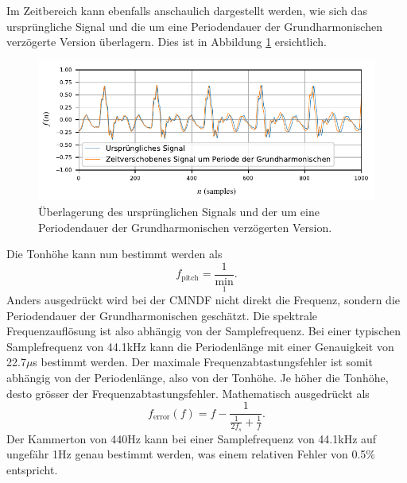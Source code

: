 Im Zeitbereich kann ebenfalls anschaulich dargestellt werden, wie sich das ursprüngliche Signal und die um eine Periodendauer der Grundharmonischen verzögerte Version überlagern.
Dies ist in Abbildung \ref{autotune:fig:audioShifted} ersichtlich.
\begin{figure}
	\centering
	\includegraphics[width=\textwidth]{papers/autotune/images/Example-Audio-Shifted.pdf}
	\caption{Überlagerung des ursprünglichen Signals und der um eine Periodendauer der Grundharmonischen verzögerten Version.}
    \label{autotune:fig:audioShifted}
\end{figure}

Die Tonhöhe kann nun bestimmt werden als
\begin{equation}
    f_{\text{pitch}}
    =
    \frac{1}{\operatorname{min}_1}.
\end{equation}
Anders ausgedrückt wird bei der CMNDF nicht direkt die Frequenz, sondern die Periodendauer der Grundharmonischen geschätzt.
Die spektrale Frequenzauflösung ist also abhängig von der Samplefrequenz.
Bei einer typischen Samplefrequenz von 44.1\;kHz kann die Periodenlänge mit einer Genauigkeit von 22.7\;$\mu$s bestimmt werden.
Der maximale Frequenzabtastungsfehler ist somit abhängig von der Periodenlänge, also von der Tonhöhe.
Je höher die Tonhöhe, desto grösser der Frequenzabtastungsfehler.
Mathematisch ausgedrückt als
\begin{equation}
    f_{\text{error}}(f)
    =
    f - \frac{1}{\frac{1}{2 f_s} + \frac{1}{f}}.
\end{equation}
Der Kammerton von 440\;Hz kann bei einer Samplefrequenz von 44.1\;kHz auf ungefähr 1\;Hz genau bestimmt werden, 
was einem relativen Fehler von 0.5\% entspricht.

